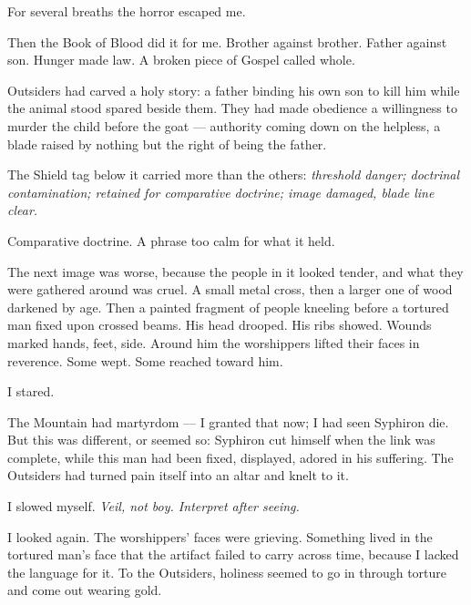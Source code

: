 For several breaths the horror escaped me.\par

Then the Book of Blood did it for me. Brother against brother. Father against son. Hunger made law. A broken piece of Gospel called whole.\par

Outsiders had carved a holy story: a father binding his own son to kill him while the animal stood spared beside them. They had made obedience a willingness to murder the child before the goat --- authority coming down on the helpless, a blade raised by nothing but the right of being the father.\par

The Shield tag below it carried more than the others: \textit{threshold danger; doctrinal contamination; retained for comparative doctrine; image damaged, blade line clear.}\par

Comparative doctrine. A phrase too calm for what it held.\par

The next image was worse, because the people in it looked tender, and what they were gathered around was cruel. A small metal cross, then a larger one of wood darkened by age. Then a painted fragment of people kneeling before a tortured man fixed upon crossed beams. His head drooped. His ribs showed. Wounds marked hands, feet, side. Around him the worshippers lifted their faces in reverence. Some wept. Some reached toward him.\par

I stared.\par

The Mountain had martyrdom --- I granted that now; I had seen Syphiron die. But this was different, or seemed so: Syphiron cut himself when the link was complete, while this man had been fixed, displayed, adored in his suffering. The Outsiders had turned pain itself into an altar and knelt to it.\par

I slowed myself. \textit{Veil, not boy. Interpret after seeing.}\par

I looked again. The worshippers' faces were grieving. Something lived in the tortured man's face that the artifact failed to carry across time, because I lacked the language for it. To the Outsiders, holiness seemed to go in through torture and come out wearing gold.\par

